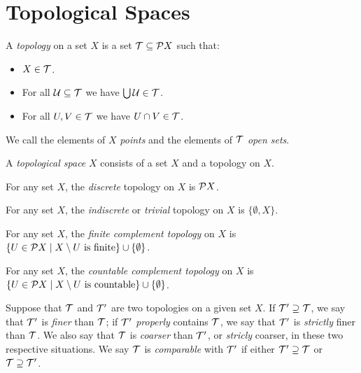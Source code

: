 
\section{Topological Spaces}

\begin{definition}[Topology]
    A \emph{topology} on a set $X$ is a set $\mathcal{T} \subseteq \mathcal{P} X$ such that:
    \begin{itemize}
        \item $X \in \mathcal{T}$.
        \item For all $\mathcal{U} \subseteq \mathcal{T}$ we have $\bigcup \mathcal{U} \in \mathcal{T}$.
        \item For all $U, V \in \mathcal{T}$ we have $U \cap V \in \mathcal{T}$.
    \end{itemize}
    We call the elements of $X$ \emph{points} and the elements of $\mathcal{T}$ \emph{open sets}.
\end{definition}

\begin{definition}
    A \emph{topological space} $X$ consists of a set $X$ and a topology on $X$.
\end{definition}

\begin{definition}
    For any set $X$, the \emph{discrete} topology on $X$ is $\mathcal{P} X$.
\end{definition}

\begin{definition}
    For any set $X$, the \emph{indiscrete} or \emph{trivial} topology on $X$ is $\{ \emptyset, X \}$.
\end{definition}

\begin{definition}
    For any set $X$, the \emph{finite complement topology} on $X$ is $\{ U \in \mathcal{P} X \mid X \setminus U \text{ is finite} \} 
    \cup \{ \emptyset \}$.
\end{definition}

\begin{definition}
    For any set $X$, the \emph{countable complement topology} on $X$ is $\{ U \in \mathcal{P} X \mid X \setminus U \text{ is countable} \} 
    \cup \{ \emptyset \}$.
\end{definition}

\begin{definition}
    Suppose that $\mathcal{T}$ and $\mathcal{T}'$ are two topologies on a given set $X$. If $\mathcal{T}' \supseteq \mathcal{T}$, we say that $\mathcal{T}'$ is \emph{finer} than
    $\mathcal{T}$; if $\mathcal{T}'$ \emph{properly} contains $\mathcal{T}$, we say that $\mathcal{T}'$ is \emph{strictly} finer than $\mathcal{T}$. We also say that $\mathcal{T}$ is
    \emph{coarser} than $\mathcal{T}'$, or \emph{stricly} coarser, in these two respective situations. We say $\mathcal{T}$ is \emph{comparable} with
    $\mathcal{T}'$ if either $\mathcal{T}' \supseteq \mathcal{T}$ or $\mathcal{T} \supseteq \mathcal{T}'$.
\end{definition}


